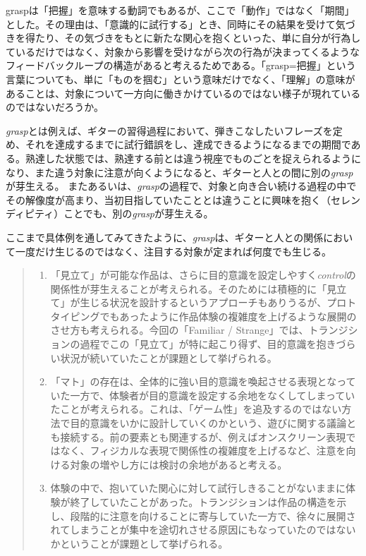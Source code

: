 graspは「把握」を意味する動詞でもあるが、ここで「動作」ではなく「期間」とした。その理由は、「意識的に試行する」とき、同時にその結果を受けて気づきを得たり、その気づきをもとに新たな関心を抱くといった、単に自分が行為しているだけではなく、対象から影響を受けながら次の行為が決まってくるようなフィードバックループの構造があると考えるためである。「grasp=把握」という言葉についても、単に「ものを掴む」という意味だけでなく、「理解」の意味があることは、対象について一方向に働きかけているのではない様子が現れているのではないだろうか。

\textit{grasp}とは例えば、ギターの習得過程において、弾きこなしたいフレーズを定め、それを達成するまでに試行錯誤をし、達成できるようになるまでの期間である。熟達した状態では、熟達する前とは違う視座でものごとを捉えられるようになり、また違う対象に注意が向くようになると、ギターと人との間に別の\textit{grasp}が芽生える。
またあるいは、\textit{grasp}の過程で、対象と向き合い続ける過程の中でその解像度が高まり、当初目指していたこととは違うことに興味を抱く（セレンディピティ）ことでも、別の\textit{grasp}が芽生える。

ここまで具体例を通してみてきたように、\textit{grasp}は、ギターと人との関係において一度だけ生じるのではなく、注目する対象が定まれば何度でも生じる。


\begin{quote}
  \begin{enumerate}
    \item 「見立て」が可能な作品は、さらに目的意識を設定しやすく\textit{control}の関係性が芽生えることが考えられる。そのためには積極的に「見立て」が生じる状況を設計するというアプローチもありうるが、プロトタイピングでもあったように作品体験の複雑度を上げるような展開のさせ方も考えられる。今回の「Familiar / Strange」では、トランジションの過程でこの「見立て」が特に起こり得ず、目的意識を抱きづらい状況が続いていたことが課題として挙げられる。
    \item 「マト」の存在は、全体的に強い目的意識を喚起させる表現となっていた一方で、体験者が目的意識を設定する余地をなくしてしまっていたことが考えられる。これは、「ゲーム性」を追及するのではない方法で目的意識をいかに設計していくのかという、遊びに関する議論とも接続する。前の要素とも関連するが、例えばオンスクリーン表現ではなく、フィジカルな表現で関係性の複雑度を上げるなど、注意を向ける対象の増やし方には検討の余地があると考える。
    \item 体験の中で、抱いていた関心に対して試行しきることがないままに体験が終了していたことがあった。トランジションは作品の構造を示し、段階的に注意を向けることに寄与していた一方で、徐々に展開されてしまうことが集中を途切れさせる原因にもなっていたのではないかということが課題として挙げられる。
  \end{enumerate}
\end{quote}